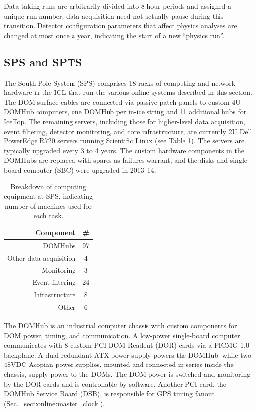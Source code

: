Data-taking runs are arbitrarily divided into 8-hour periods and assigned
a unique run number; data acquisition need not actually pause during
this transition.  Detector configuration parameters that affect physics
analyses are changed at most once a year, indicating the start of a new
``physics run''.   

\subsection{\label{sect:sps}SPS and SPTS}

The South Pole System (SPS) comprises 18 racks of computing and network
hardware in the ICL that run the various online systems described in this
section.  The DOM surface cables are connected via passive patch panels to
custom 4U DOMHub computers, one DOMHub per in-ice string and 11 additional
hubs for IceTop.  The remaining servers, including those for higher-level
data acquisition, event filtering, detector monitoring, and core
infrastructure, are currently 2U Dell PowerEdge R720 servers running
Scientific Linux (see Table \ref{tab:sps_breakdown}).  The servers are
typically upgraded every 3 to 4 years.  The custom hardware components in
the DOMHubs are replaced with spares as failures warrant, and the disks and
single-board computer (SBC) were upgraded in 2013--14.

\begin{table}[h]
  \centering
\caption{Breakdown of computing equipment at SPS, indicating number of
    machines used for each task.}
  \begin{tabular}{ r  c }
\hline
    Component & \# \\ \hline DOMHubs & 97 \\ Other data
    acquisition & 4 \\
    Monitoring & 3 \\ Event filtering & 24 \\ Infrastructure & 8 \\ Other &
    6 \\
\hline
  \end{tabular}
  \label{tab:sps_breakdown}
\end{table}

The DOMHub is an industrial computer chassis with custom components for DOM
power, timing, and communication.  A low-power single-board computer
communicates with 8 custom PCI DOM Readout (DOR) cards via a PICMG 1.0
backplane.  A dual-redundant ATX power supply powers the DOMHub, while two
48VDC Acopian power supplies, mounted and connected in series inside the
chassis, supply power to the DOMs.  The DOM power is switched and
monitoring by the DOR cards and is controllable by software.  Another PCI
card, the DOMHub Service Board (DSB), is responsible for GPS timing fanout
(Sec.~\ref{sect:online:master_clock}).

